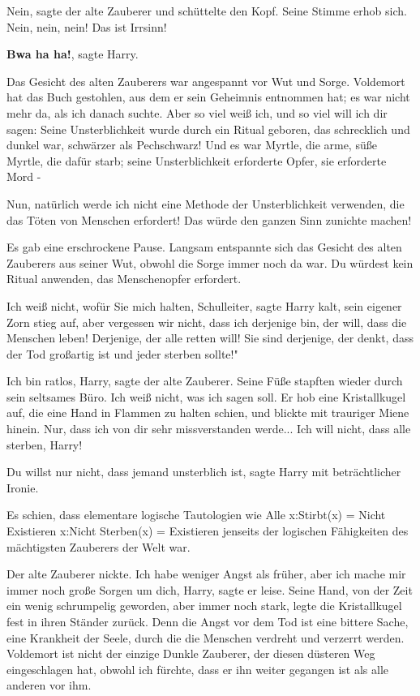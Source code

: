 \glqq Nein\grqq{}, sagte der alte Zauberer und schüttelte den Kopf. Seine Stimme
erhob sich. \glqq Nein, nein, nein! Das ist Irrsinn!\grqq{}

\glqq \textbf{Bwa ha ha!}\grqq{}, sagte Harry.

Das Gesicht des alten Zauberers war angespannt vor Wut und Sorge. \glqq
Voldemort hat das Buch gestohlen, aus dem er sein Geheimnis entnommen hat; es
war nicht mehr da, als ich danach suchte. Aber so viel weiß ich, und so viel
will ich dir sagen: Seine Unsterblichkeit wurde durch ein Ritual geboren, das
schrecklich und dunkel war, schwärzer als Pechschwarz! Und es war Myrtle, die
arme, süße Myrtle, die dafür starb; seine Unsterblichkeit erforderte Opfer, sie
erforderte Mord -\grqq{}

\glqq Nun, natürlich werde ich nicht eine Methode der Unsterblichkeit verwenden,
die das Töten von Menschen erfordert! Das würde den ganzen Sinn zunichte
machen!\grqq{}

Es gab eine erschrockene Pause. Langsam entspannte sich das Gesicht des alten
Zauberers aus seiner Wut, obwohl die Sorge immer noch da war. \glqq Du würdest
kein Ritual anwenden, das Menschenopfer erfordert.\grqq{}

\glqq Ich weiß nicht, wofür Sie mich halten, Schulleiter\grqq{}, sagte Harry
kalt, sein eigener Zorn stieg auf, \glqq aber vergessen wir nicht, dass ich
derjenige bin, der will, dass die Menschen leben! Derjenige, der alle retten
will! Sie sind derjenige, der denkt, dass der Tod großartig ist und jeder
sterben sollte!"

\glqq Ich bin ratlos, Harry\grqq{}, sagte der alte Zauberer. Seine Füße stapften
wieder durch sein seltsames Büro. \glqq Ich weiß nicht, was ich sagen
soll.\grqq{} Er hob eine Kristallkugel auf, die eine Hand in Flammen zu halten
schien, und blickte mit trauriger Miene hinein. \glqq Nur, dass ich von dir sehr
missverstanden werde... Ich will nicht, dass alle sterben, Harry!\grqq{}

\glqq Du willst nur nicht, dass jemand unsterblich ist\grqq{}, sagte Harry mit
beträchtlicher Ironie.

Es schien, dass elementare logische Tautologien wie Alle x:Stirbt(x) = Nicht
Existieren x:Nicht Sterben(x) = Existieren jenseits der logischen Fähigkeiten
des mächtigsten Zauberers der Welt war.

Der alte Zauberer nickte. \glqq Ich habe weniger Angst als früher, aber ich
mache mir immer noch große Sorgen um dich, Harry\grqq{}, sagte er leise. Seine
Hand, von der Zeit ein wenig schrumpelig geworden, aber immer noch stark, legte
die Kristallkugel fest in ihren Ständer zurück. \glqq Denn die Angst vor dem Tod
ist eine bittere Sache, eine Krankheit der Seele, durch die die Menschen
verdreht und verzerrt werden. Voldemort ist nicht der einzige Dunkle Zauberer,
der diesen düsteren Weg eingeschlagen hat, obwohl ich fürchte, dass er ihn
weiter gegangen ist als alle anderen vor ihm.\grqq{}

